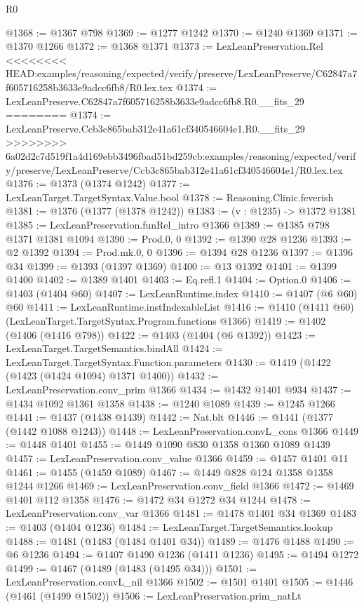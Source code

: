 \begin{lexlean}{R0}
\begin{coremodule}
{{{{{{{{{{{{{{{{{{{{{{{{{{{{{{{{{{{{{{{{{{{{{{{{{{{{{{{{{{{{{{{{{{{{{{{{{{{{{{{{{{{{{{@1368 := @1367 @798
@1369 := @1277 @1242
@1370 := @1240 @1369
@1371 := @1370 @1266
@1372 := @1368 @1371
@1373 := LexLeanPreservation.Rel
<<<<<<<< HEAD:examples/reasoning/expected/verify/preserve/LexLeanPreserve/C62847a7f605716258b3633e9adcc6fb8/R0.lex.tex
@1374 := LexLeanPreserve.C62847a7f605716258b3633e9adcc6fb8.R0.__fits_29
========
@1374 := LexLeanPreserve.Ccb3c865bab312e41a61cf340546604e1.R0.__fits_29
>>>>>>>> 6a02d2c7d519f1a4d169ebb3496fbad51bd259cb:examples/reasoning/expected/verify/preserve/LexLeanPreserve/Ccb3c865bab312e41a61cf340546604e1/R0.lex.tex
@1376 := @1373 (@1374 @1242)
@1377 := LexLeanTarget.TargetSyntax.Value.bool
@1378 := Reasoning.Clinic.feverish
@1381 := @1376 (@1377 (@1378 @1242))
@1383 := (v : @1235) -> @1372 @1381
@1385 := LexLeanPreservation.funRel_intro @1366
@1389 := @1385 @798 @1371 @1381 @1094
@1390 := Prod.{0, 0}
@1392 := @1390 @28 @1236
@1393 := @2 @1392
@1394 := Prod.mk.{0, 0}
@1396 := @1394 @28 @1236
@1397 := @1396 @34
@1399 := @1393 (@1397 @1369)
@1400 := @13 @1392
@1401 := @1399 @1400
@1402 := @1389 @1401
@1403 := Eq.refl.{1}
@1404 := Option.{0}
@1406 := @1403 (@1404 @60)
@1407 := LexLeanRuntime.index
@1410 := @1407 (@6 @60) @60
@1411 := LexLeanRuntime.instIndexableList
@1416 := @1410 (@1411 @60) (LexLeanTarget.TargetSyntax.Program.functions @1366)
@1419 := @1402 (@1406 (@1416 @798))
@1422 := @1403 (@1404 (@6 @1392))
@1423 := LexLeanTarget.TargetSemantics.bindAll
@1424 := LexLeanTarget.TargetSyntax.Function.parameters
@1430 := @1419 (@1422 (@1423 (@1424 @1094) @1371 @1400))
@1432 := LexLeanPreservation.conv_prim @1366
@1434 := @1432 @1401 @934
@1437 := @1434 @1092 @1361 @1358
@1438 := @1240 @1089
@1439 := @1245 @1266
@1441 := @1437 (@1438 @1439)
@1442 := Nat.blt
@1446 := @1441 (@1377 (@1442 @1088 @1243))
@1448 := LexLeanPreservation.convL_cons @1366
@1449 := @1448 @1401
@1455 := @1449 @1090 @830 @1358 @1360 @1089 @1439
@1457 := LexLeanPreservation.conv_value @1366
@1459 := @1457 @1401 @11
@1461 := @1455 (@1459 @1089)
@1467 := @1449 @828 @124 @1358 @1358 @1244 @1266
@1469 := LexLeanPreservation.conv_field @1366
@1472 := @1469 @1401 @112 @1358
@1476 := @1472 @34 @1272 @34 @1244
@1478 := LexLeanPreservation.conv_var @1366
@1481 := @1478 @1401 @34 @1369
@1483 := @1403 (@1404 @1236)
@1484 := LexLeanTarget.TargetSemantics.lookup
@1488 := @1481 (@1483 (@1484 @1401 @34))
@1489 := @1476 @1488
@1490 := @6 @1236
@1494 := @1407 @1490 @1236 (@1411 @1236)
@1495 := @1494 @1272
@1499 := @1467 (@1489 (@1483 (@1495 @34)))
@1501 := LexLeanPreservation.convL_nil @1366
@1502 := @1501 @1401
@1505 := @1446 (@1461 (@1499 @1502))
@1506 := LexLeanPreservation.prim_natLt
}}}}}}}}}}}}}}}}}}}}}}}}}}}}}}}}}}}}}}}}}}}}}}}}}}}}}}}}}}}}}}}}}}}}}}}}}}}}}}}}}}}}}}
\end{coremodule}
\end{lexlean}
